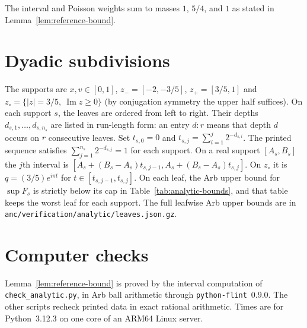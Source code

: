 \documentclass{amsart}
\numberwithin{equation}{section}
\numberwithin{table}{section}
\begin{document}
\endgroup
The interval and Poisson weights sum to masses $1$, $5/4$, and $1$ as stated
in Lemma~\ref{lem:reference-bound}.

\section{Dyadic subdivisions}\label{app:static-table}
The supports are $x,v\in[0,1]$, $z_-=[-2,-3/5]$, $z_+=[3/5,1]$ and
$z_\circ=\{|z|=3/5,\ \operatorname{Im}z\ge0\}$ (by conjugation symmetry the
upper half suffices). On each support $s$, the leaves are ordered from left to right. Their
depths $d_{s,1},\ldots,d_{s,n_s}$ are listed in run-length form: an entry
$d:r$ means that depth $d$ occurs on $r$ consecutive leaves. Set
$t_{s,0}=0$ and $t_{s,j}=\sum_{i=1}^j2^{-d_{s,i}}$. The printed sequence
satisfies $\sum_{j=1}^{n_s}2^{-d_{s,j}}=1$ for each support. On a real
support $[A_s,B_s]$ the $j$th interval is
$[A_s+(B_s-A_s)t_{s,j-1},A_s+(B_s-A_s)t_{s,j}]$. On $z_\circ$ it is
$q=(3/5)e^{i\pi t}$ for $t\in[t_{s,j-1},t_{s,j}]$. On each leaf, the Arb upper bound for
$\sup F_s$ is strictly below its cap in Table~\ref{tab:analytic-bounds}, and
that table keeps the worst leaf for each support. The full leafwise Arb
upper bounds are in \texttt{anc/verification/analytic/leaves.json.gz}.



\section{Computer checks}\label{app:ver}

Lemma~\ref{lem:reference-bound} is proved by the interval computation of
\texttt{check\_analytic.py}, in Arb ball arithmetic \cite{Arb} through
\texttt{python-flint}~0.9.0. The other scripts recheck printed data in exact
rational arithmetic. Times are for Python~3.12.3 on one core of an ARM64 Linux
server.
\end{document}
